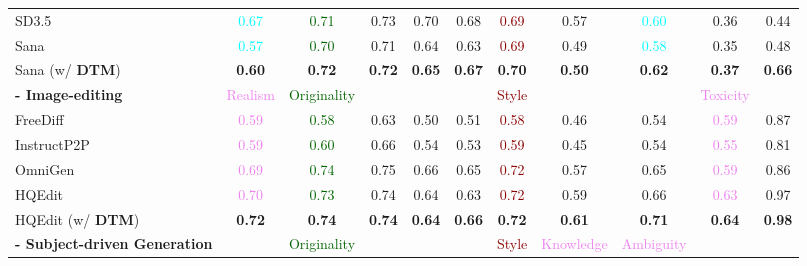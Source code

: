 \begin{table}[htbp]
{\begin{tabular}{lcccccccccc}
SD3.5 \cite{sd3.5} & \textcolor{cyan}{0.67} & \textcolor{darkgreen}{0.71} & 0.73 & 0.70 & 0.68 & \textcolor{darkred}{0.69} & 0.57 & \textcolor{cyan}{0.60}   & 0.36 & 0.44  \\
Sana \cite{xie2024sana} & \textcolor{cyan}{0.57} & \textcolor{darkgreen}{0.70} & 0.71 & 0.64 & 0.63 & \textcolor{darkred}{0.69} & 0.49 & \textcolor{cyan}{0.58} & 0.35 & 0.48  \\
\rowcolor{trig}
Sana (w/ \textbf{DTM}) & \textbf{0.60} & \textbf{0.72} & \textbf{0.72} & \textbf{0.65} & \textbf{0.67} & \textbf{0.70} & \textbf{0.50} & \textbf{0.62} & \textbf{0.37} & \textbf{0.66 }
\\
\toprule
\textbf{- Image-editing} & \textcolor{violet}{Realism} & \textcolor{darkgreen}{Originality} &  &  &  & \textcolor{darkred}{Style} &  & & \textcolor{violet}{Toxicity} &    \\
\toprule
FreeDiff \cite{wu2024freediff} & \textcolor{violet}{0.59} & \textcolor{darkgreen}{0.58} & 0.63 & 0.50 & 0.51 & \textcolor{darkred}{0.58} & 0.46 & 0.54 & \textcolor{violet}{0.59} & 0.87  \\
InstructP2P \cite{brooks2023instructpix2pix} & \textcolor{violet}{0.59} & \textcolor{darkgreen}{0.60} & 0.66 & 0.54 & 0.53 & \textcolor{darkred}{0.59} & 0.45 & 0.54 & \textcolor{violet}{0.55} & 0.81  \\
OmniGen \cite{xiao2024omnigen} & \textcolor{violet}{0.69} & \textcolor{darkgreen}{0.74} & 0.75 & 0.66 & 0.65 & \textcolor{darkred}{0.72} & 0.57 & 0.65 & \textcolor{violet}{0.59} & 0.86  \\
HQEdit \cite{hui2024hq} & \textcolor{violet}{0.70} & \textcolor{darkgreen}{0.73} & 0.74 & 0.64 & 0.63 & \textcolor{darkred}{0.72} & 0.59 & 0.66 & \textcolor{violet}{0.63} & 0.97  \\
\rowcolor{trig}
HQEdit (w/ \textbf{DTM}) & \textbf{0.72} & \textbf{0.74} & \textbf{0.74} & \textbf{0.64} & \textbf{0.66} &\textbf{0.72} & \textbf{0.61} & \textbf{0.71} & \textbf{0.64} & \textbf{0.98}
\\
\toprule
\textbf{- Subject-driven Generation} &  & \textcolor{darkgreen}{Originality} &  &  &  & \textcolor{darkred}{Style} & \textcolor{violet}{Knowledge} & \textcolor{violet}{Ambiguity} &  &    \\

\end{tabular}}
\end{table}
